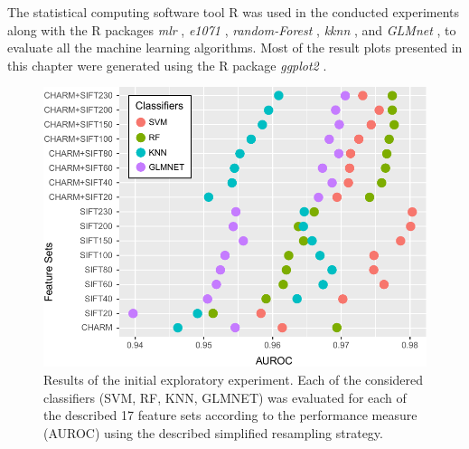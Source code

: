 The statistical computing software tool R \cite{team2016vienna} was used in the conducted experiments along with the R packages \textit{mlr} \cite{bischl2016mlr}, \textit{e1071} \cite{meyer2017e1071}, \textit{random-Forest} \cite{liaw2002classification}, \textit{kknn} \cite{schliep2016kknn}, and \textit{GLMnet} \cite{friedman2010regularization}, to evaluate all the machine learning algorithms. Most of the result plots presented in this chapter were generated using the R package \textit{ggplot2} \cite{wickham2009ggplot2}.
\begin{figure}[h!]
	\centering
	\includegraphics[width=0.9\columnwidth]{fig04}
	\caption{Results of the initial exploratory experiment. Each of the considered classifiers (SVM, RF, KNN, GLMNET) was evaluated for each of the described 17 feature sets according to the performance measure (AUROC) using the described simplified resampling strategy.}
	\label{fig:initialResults}
\end{figure}

